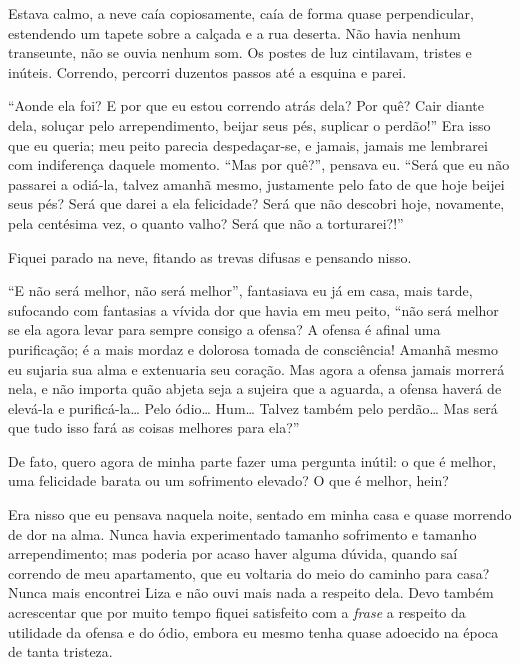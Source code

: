 Estava calmo, a neve caía copiosamente, caía de forma quase
perpendicular, estendendo um tapete sobre a calçada e a rua deserta.
Não havia nenhum transeunte, não se ouvia nenhum som. Os postes de luz
cintilavam, tristes e inúteis. Correndo, percorri duzentos passos até a
esquina e parei.

“Aonde ela foi? E por que eu estou correndo atrás dela? Por quê? Cair
diante dela, soluçar pelo arrependimento, beijar seus pés, suplicar o
perdão!” Era isso que eu queria; meu peito parecia despedaçar-se, e
jamais, jamais me lembrarei com indiferença daquele momento. “Mas por
quê?”, pensava eu. “Será que eu não passarei a odiá-la, talvez amanhã
mesmo, justamente pelo fato de que hoje beijei seus pés? Será que darei
a ela felicidade? Será que não descobri hoje, novamente, pela centésima
vez, o quanto valho? Será que não a torturarei?!”

Fiquei parado na neve, fitando as trevas difusas e pensando nisso.

“E não será melhor, não será melhor”, fantasiava eu já em casa, mais
tarde, sufocando com fantasias a vívida dor que havia em meu peito,
“não será melhor se ela agora levar para sempre consigo a ofensa? A
ofensa é afinal uma purificação; é a mais mordaz e dolorosa tomada de
consciência! Amanhã mesmo eu sujaria sua alma e extenuaria seu coração.
Mas agora a ofensa jamais morrerá nela, e não importa quão abjeta seja
a sujeira que a aguarda, a ofensa haverá de elevá-la e purificá-la\ldots{}
Pelo ódio\ldots{} Hum\ldots{} Talvez também pelo perdão\ldots{} Mas será que tudo isso
fará as coisas melhores para ela?”

De fato, quero agora de minha parte fazer uma pergunta inútil: o que é
melhor, uma felicidade barata ou um sofrimento elevado? O que é
melhor, hein?

Era nisso que eu pensava naquela noite, sentado em minha casa e quase
morrendo de dor na alma. Nunca havia experimentado tamanho sofrimento e
tamanho arrependimento; mas poderia por acaso haver alguma dúvida,
quando saí correndo de meu apartamento, que eu voltaria do meio do
caminho para casa? Nunca mais encontrei Liza e não ouvi mais nada a
respeito dela. Devo também acrescentar que por muito tempo fiquei
satisfeito com a \textit{frase} a respeito da utilidade da ofensa e do
ódio, embora eu mesmo tenha quase adoecido na época de tanta tristeza.

